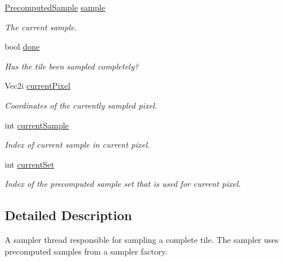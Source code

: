 \begin{DoxyCompactItemize}
\hyperlink{structembree_1_1_precomputed_sample}{PrecomputedSample} \hyperlink{classembree_1_1_sampler_a69bf7ba758fa6d8b48986ab8f4dbd682}{sample}
\begin{DoxyCompactList}\small\item\em The current sample. \item\end{DoxyCompactList}\item 
\hypertarget{classembree_1_1_sampler_ab9944f61c4eeeee85569dee6a284a9a5}{
bool \hyperlink{classembree_1_1_sampler_ab9944f61c4eeeee85569dee6a284a9a5}{done}}
\label{classembree_1_1_sampler_ab9944f61c4eeeee85569dee6a284a9a5}

\begin{DoxyCompactList}\small\item\em Has the tile been sampled completely? \item\end{DoxyCompactList}\item 
Vec2i \hyperlink{classembree_1_1_sampler_a74b47fa80bd0380e31c4c54d8a2467ce}{currentPixel}
\begin{DoxyCompactList}\small\item\em Coordinates of the currently sampled pixel. \item\end{DoxyCompactList}\item 
int \hyperlink{classembree_1_1_sampler_ae2b3b42c1fdb1edc47f1768f5da477d0}{currentSample}
\begin{DoxyCompactList}\small\item\em Index of current sample in current pixel. \item\end{DoxyCompactList}\item 
int \hyperlink{classembree_1_1_sampler_a0654a2f76c561619a3741ac89a59ee96}{currentSet}
\begin{DoxyCompactList}\small\item\em Index of the precomputed sample set that is used for current pixel. \item\end{DoxyCompactList}\end{DoxyCompactItemize}


\subsection{Detailed Description}
A sampler thread responsible for sampling a complete tile. The sampler uses precomputed samples from a sampler factory. 

